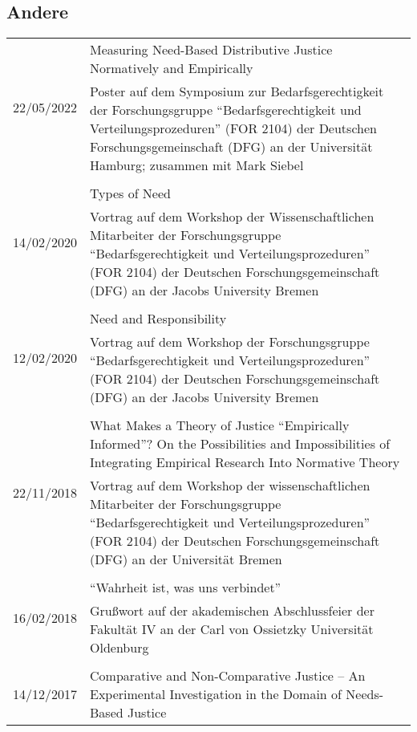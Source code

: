 \documentclass[a4paper,10pt]{article}
\begin{document}
\subsection*{Andere}
\begin{longtable}{p{}p{}}
\multirow{2}{1,75cm}{\footnotesize{22/05/2022}} & Measuring Need-Based Distributive Justice Normatively and Empirically\\
& \footnotesize{Poster auf dem Symposium zur Bedarfsgerechtigkeit der Forschungsgruppe \enquote{Bedarfsgerechtigkeit und Verteilungsprozeduren} (FOR 2104) der Deutschen Forschungsgemeinschaft (DFG) an der Universität Hamburg; zusammen mit Mark Siebel}\\
\\
\multirow{2}{1,75cm}{\footnotesize{14/02/2020}} & Types of Need\\
& \footnotesize{Vortrag auf dem Workshop der Wissenschaftlichen Mitarbeiter der Forschungsgruppe \enquote{Bedarfsgerechtigkeit und Verteilungsprozeduren} (FOR 2104) der Deutschen Forschungsgemeinschaft (DFG) an der Jacobs University Bremen}\\
\\
\multirow{2}{1,75cm}{\footnotesize{12/02/2020}} & Need and Responsibility\\
& \footnotesize{Vortrag auf dem Workshop der Forschungsgruppe \enquote{Bedarfsgerechtigkeit und Verteilungsprozeduren} (FOR 2104) der Deutschen Forschungsgemeinschaft (DFG) an der Jacobs University Bremen}\\
\\
\multirow{2}{1,75cm}{\footnotesize{22/11/2018}} & What Makes a Theory of Justice \enquote{Empirically Informed}? On the Possibilities and Impossibilities of Integrating Empirical Research Into Normative Theory\\
& \footnotesize{Vortrag auf dem Workshop der wissenschaftlichen Mitarbeiter der Forschungsgruppe \enquote{Bedarfsgerechtigkeit und Verteilungsprozeduren} (FOR 2104) der Deutschen Forschungsgemeinschaft (DFG) an der Universität Bremen}\\
\\
\multirow{2}{1,75cm}{\footnotesize{16/02/2018}} & \enquote{Wahrheit ist, was uns verbindet}\\
& \footnotesize{Grußwort auf der akademischen Abschlussfeier der Fakultät IV an der Carl von Ossietzky Universität Oldenburg}\\
\\
\multirow{2}{1,75cm}{\footnotesize{14/12/2017}} & Comparative and Non-Comparative Justice -- An Experimental Investigation in the Domain of Needs-Based Justice\\

\end{longtable}
\end{document}
